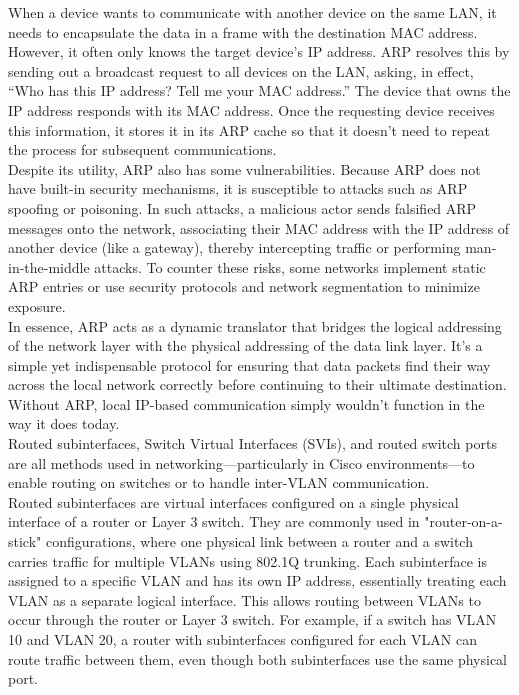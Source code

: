 \documentclass{article}
\begin{document}
When a device wants to communicate with another device on the same LAN, it needs to encapsulate the data in a frame with the destination MAC address. However, it often only knows the target device’s IP address. ARP resolves this by sending out a broadcast request to all devices on the LAN, asking, in effect, “Who has this IP address? Tell me your MAC address.” The device that owns the IP address responds with its MAC address. Once the requesting device receives this information, it stores it in its ARP cache so that it doesn't need to repeat the process for subsequent communications.\\

Despite its utility, ARP also has some vulnerabilities. Because ARP does not have built-in security mechanisms, it is susceptible to attacks such as ARP spoofing or poisoning. In such attacks, a malicious actor sends falsified ARP messages onto the network, associating their MAC address with the IP address of another device (like a gateway), thereby intercepting traffic or performing man-in-the-middle attacks. To counter these risks, some networks implement static ARP entries or use security protocols and network segmentation to minimize exposure.\\

In essence, ARP acts as a dynamic translator that bridges the logical addressing of the network layer with the physical addressing of the data link layer. It's a simple yet indispensable protocol for ensuring that data packets find their way across the local network correctly before continuing to their ultimate destination. Without ARP, local IP-based communication simply wouldn't function in the way it does today.\\

Routed subinterfaces, Switch Virtual Interfaces (SVIs), and routed switch ports are all methods used in networking—particularly in Cisco environments—to enable routing on switches or to handle inter-VLAN communication.\\

Routed subinterfaces are virtual interfaces configured on a single physical interface of a router or Layer 3 switch. They are commonly used in "router-on-a-stick" configurations, where one physical link between a router and a switch carries traffic for multiple VLANs using 802.1Q trunking. Each subinterface is assigned to a specific VLAN and has its own IP address, essentially treating each VLAN as a separate logical interface. This allows routing between VLANs to occur through the router or Layer 3 switch. For example, if a switch has VLAN 10 and VLAN 20, a router with subinterfaces configured for each VLAN can route traffic between them, even though both subinterfaces use the same physical port.\\
\end{document}
